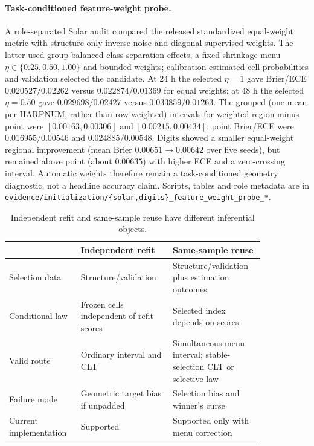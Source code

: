 \documentclass[11pt,a4paper]{article}
\numberwithin{equation}{section}
\theoremstyle{definition}\newtheorem{definition}[theorem]{Definition}
\theoremstyle{remark}\newtheorem{remark}[theorem]{Remark}
\begin{document}
\paragraph{Task-conditioned feature-weight probe.}
A role-separated Solar audit compared the released standardized equal-weight
metric with structure-only inverse-noise and diagonal supervised weights. The
latter used group-balanced class-separation effects, a fixed shrinkage menu
$\eta\in\{0.25,0.50,1.00\}$ and bounded weights; calibration estimated cell
probabilities and validation selected the candidate. At 24 h the selected
$\eta=1$ gave Brier/ECE $0.020527/0.02262$ versus $0.022874/0.01369$ for
equal weights; at 48 h the selected $\eta=0.50$ gave $0.029698/0.02427$
versus $0.033859/0.01263$. The grouped (one mean per HARPNUM, rather than row-weighted)
intervals for weighted region minus point were $[0.00163,0.00306]$ and $[0.00215,0.00434]$;
point Brier/ECE were $0.016955/0.00546$ and $0.024885/0.00548$.
Digits showed a smaller equal-weight regional improvement (mean Brier
$0.00651\rightarrow0.00642$ over five seeds), but remained above point
(about $0.00635$) with higher ECE and a zero-crossing interval. Automatic
weights therefore remain a task-conditioned geometry diagnostic, not a
headline accuracy claim. Scripts, tables and role metadata are in
\texttt{evidence/initialization/\{solar,digits\}\_feature\_weight\_probe\_*}.

\begin{table}[ht]
\centering\small
\caption{Independent refit and same-sample reuse have different inferential objects.}
\begin{tabular}{L{0.22\linewidth}L{0.31\linewidth}L{0.31\linewidth}}
\toprule
 & Independent refit & Same-sample reuse\\
\midrule
Selection data & Structure/validation & Structure/validation plus estimation outcomes\\
Conditional law & Frozen cells independent of refit scores & Selected index depends on scores\\
Valid route & Ordinary interval and CLT & Simultaneous menu interval; stable-selection CLT or selective law\\
Failure mode & Geometric target bias if unpadded & Selection bias and winner's curse\\
Current implementation & Supported & Supported only with menu correction\\
\bottomrule
\end{tabular}
\end{table}
\end{document}
